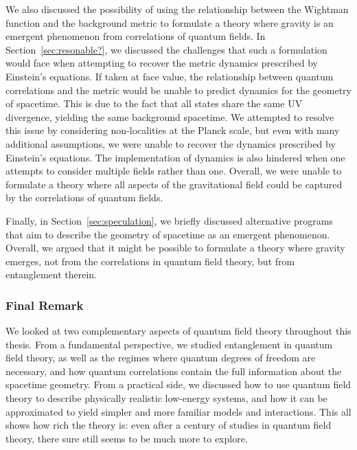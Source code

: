 \documentclass[letterpaper,12pt,titlepage,oneside,final]{book}
\begin{document}
We also discussed the possibility of using the relationship between the Wightman function and the background metric to formulate a theory where gravity is an emergent phenomenon from correlations of quantum fields. In Section~\ref{sec:resonable?}, we discussed the challenges that such a formulation would face when attempting to recover the metric dynamics prescribed by Einstein's equations. If taken at face value, the relationship between quantum correlations and the metric would be unable to predict dynamics for the geometry of spacetime. This is due to the fact that all states share the same UV divergence, yielding the same background spacetime. We attempted to resolve this issue by considering non-localities at the Planck scale, but even with many additional assumptions, we were unable to recover the dynamics prescribed by Einstein's equations. The implementation of dynamics is also hindered when one attempts to consider multiple fields rather than one. Overall, we were unable to formulate a theory where all aspects of the gravitational field could be captured by the correlations of quantum fields.

Finally, in Section~\ref{sec:speculation}, we briefly discussed alternative programs that aim to describe the geometry of spacetime as an emergent phenomenon. Overall, we argued that it might be possible to formulate a theory where gravity emerges, not from the correlations in quantum field theory, but from entanglement therein.

\subsubsection*{Final Remark}

We looked at two complementary aspects of quantum field theory throughout this thesis. From a fundamental perspective, we studied entanglement in quantum field theory, as well as the regimes where quantum degrees of freedom are necessary, and how quantum correlations contain the full information about the spacetime geometry. From a practical side, we discussed how to use quantum field theory to describe physically realistic low-energy systems, and how it can be approximated to yield simpler and more familiar models and interactions. This all shows how rich the theory is: even after a century of studies in quantum field theory, there sure still seems to be much more to explore.
\end{document}

